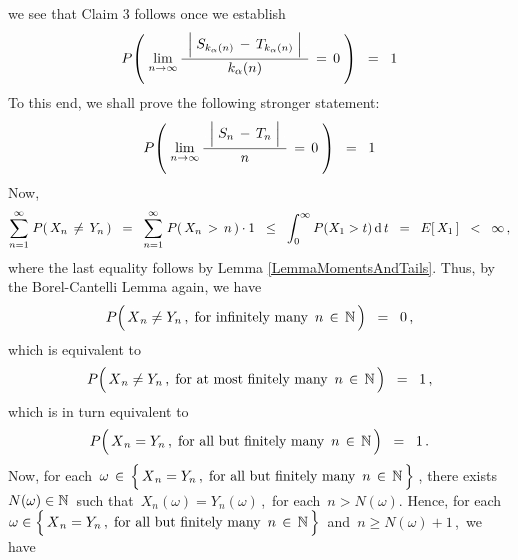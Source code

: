 \begin{enumerate}
we see that Claim 3 follows once we establish
\begin{equation*}
P\!\left(\;
	\underset{n\rightarrow\infty}{\lim}\,
	\dfrac{{\color{white}.}
		\left\vert\;
		S_{k_{\alpha}(n)} \,\overset{{\color{white}.}}{-}\, T_{k_{\alpha}(n)}
		\;\right\vert
		{\color{white}.}}{
		k_{\alpha}(n)
		}
		\,=\, 0
	\;\right)
\;\; = \;\; 1
\end{equation*}
To this end, we shall prove the following stronger statement:
\begin{equation*}
P\!\left(\;
	\underset{n\rightarrow\infty}{\lim}\,
	\dfrac{{\color{white}.}
		\left\vert\;
		S_{n} \,\overset{{\color{white}.}}{-}\, T_{n}
		\;\right\vert
		{\color{white}.}}{
		n
		}
		\,=\, 0
	\;\right)
\;\; = \;\; 1
\end{equation*}
Now,
\begin{equation*}
\overset{\infty}{\underset{n=1}{\sum}}\;P\!\left(\,X_{n} \,\neq\, Y_{n}\,\right)
\;\; = \;\;
	\overset{\infty}{\underset{n=1}{\sum}}\;P\!\left(\,X_{n} \,>\, n\,\right) \cdot 1
\;\; \leq \;\;
	\int_{0}^{\infty}P(X_{1} > t)\,\textnormal{d}\,t
\;\; = \;\;
	E\!\left[\,X_{1}\,\right]
\;\; < \;\;
	\infty\,,
\end{equation*}
where the last equality follows by Lemma \ref{LemmaMomentsAndTails}.
Thus, by the Borel-Cantelli Lemma again, we have
\begin{equation*}
P\!\left(\,\overset{{\color{white}.}}{X}_{n} \neq Y_{n}\,,\;\textnormal{for infinitely many \,$n\,\in\,\N$}\,\right)
\;\; = \;\; 0\,,
\end{equation*}
which is equivalent to
\begin{equation*}
P\!\left(\,\overset{{\color{white}.}}{X}_{n} \neq Y_{n}\,,\;\textnormal{for at most finitely many \,$n\,\in\,\N$}\,\right)
\;\; = \;\; 1\,,
\end{equation*}
which is in turn equivalent to
\begin{equation*}
P\!\left(\,\overset{{\color{white}.}}{X}_{n} = Y_{n}\,,\;\textnormal{for all but finitely many \,$n\,\in\,\N$}\,\right)
\;\; = \;\; 1\,.
\end{equation*}
Now, for each
\,$\omega \,\in\, \left\{\,\overset{{\color{white}.}}{X}_{n} = Y_{n}\,,\;\textnormal{for all but finitely many \,$n\,\in\,\N$}\,\right\}$\,, there exists \,$N(\omega) \in \mathbb{N}$\, such that \,$X_{n}(\omega) = Y_{n}(\omega)$\,,\, for each \,$n > N(\omega)$.
Hence, for each
\,$\omega \in \left\{\,\overset{{\color{white}.}}{X}_{n} = Y_{n}\,,\;\textnormal{for all but finitely many \,$n\,\in\,\N$}\,\right\}$\,
and \,$n \geq N(\omega)+1$\,,\, we have

\end{enumerate}
